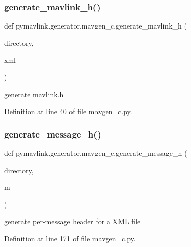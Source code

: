 \subsubsection{\texorpdfstring{generate\_mavlink\_h()}{generate\_mavlink\_h()}}
{\footnotesize\ttfamily def pymavlink.\+generator.\+mavgen\+\_\+c.\+generate\+\_\+mavlink\+\_\+h (\begin{DoxyParamCaption}\item[{}]{directory,  }\item[{}]{xml }\end{DoxyParamCaption})}

\begin{DoxyVerb}generate mavlink.h\end{DoxyVerb}
 

Definition at line 40 of file mavgen\+\_\+c.\+py.

\mbox{\label{namespacepymavlink_1_1generator_1_1mavgen__c_a123dcae06322bbc40fe755d31c7064ad}} 
\subsubsection{\texorpdfstring{generate\_message\_h()}{generate\_message\_h()}}
{\footnotesize\ttfamily def pymavlink.\+generator.\+mavgen\+\_\+c.\+generate\+\_\+message\+\_\+h (\begin{DoxyParamCaption}\item[{}]{directory,  }\item[{}]{m }\end{DoxyParamCaption})}

\begin{DoxyVerb}generate per-message header for a XML file\end{DoxyVerb}
 

Definition at line 171 of file mavgen\+\_\+c.\+py.

\mbox{\label{namespacepymavlink_1_1generator_1_1mavgen__c_aab7c75fa969b1d44059ca021ff91c91f}} 
